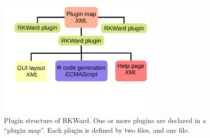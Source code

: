 \begin{figure}[b!]
 \centering
 \includegraphics[width=8cm]{../figures/plugin_structure.pdf}
 \caption{Plugin structure of RKWard. One or more plugins are declared in a ``plugin map''. Each plugin is defined by
 two  files, and one  file.}
 \label{fig:plugin_structure}
\end{figure}

